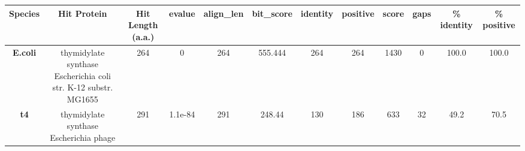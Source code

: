 \begin{tabular}{|c|c|c|c|c|c|c|c|c|c|c|c|} \hline
\textbf{Species} & \textbf{Hit Protein} & \textbf{Hit Length (a.a.)} & \textbf{evalue} & \textbf{align\_len} & \textbf{bit\_score} & \textbf{identity} & \textbf{positive} & \textbf{score} & \textbf{gaps} & \textbf{\% identity} & \textbf{\% positive} \\ \hline
\textbf{E.coli} & thymidylate synthase Escherichia coli str. K-12 substr. MG1655 & 264 & 0 & 264 & 555.444 & 264 & 264 & 1430 & 0 & 100.0 & 100.0\\
\textbf{t4} & thymidylate synthase Escherichia phage  & 291 & 1.1e-84 & 291 & 248.44 & 130 & 186 & 633 & 32 & 49.2 & 70.5\\
\hline \end{tabular}
